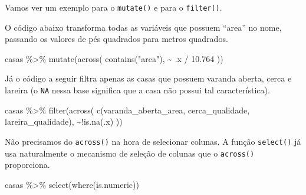 \documentclass[
]{book}
\newenvironment{Shaded}{\begin{snugshade}}{\end{snugshade}}
\newcommand{\FloatTok}[1]{\textcolor[rgb]{0.00,0.00,0.81}{#1}}
\newcommand{\FunctionTok}[1]{\textcolor[rgb]{0.00,0.00,0.00}{#1}}
\newcommand{\NormalTok}[1]{#1}
\newcommand{\SpecialCharTok}[1]{\textcolor[rgb]{0.00,0.00,0.00}{#1}}
\newcommand{\StringTok}[1]{\textcolor[rgb]{0.31,0.60,0.02}{#1}}
\begin{document}
Vamos ver um exemplo para o \texttt{mutate()} e para o \texttt{filter()}.

O código abaixo transforma todas as variáveis que possuem ``area'' no nome, passando os valores de pés quadrados para metros quadrados.

\begin{Shaded}
\begin{Highlighting}[]
\NormalTok{casas }\SpecialCharTok{\%\textgreater{}\%}
  \FunctionTok{mutate}\NormalTok{(}\FunctionTok{across}\NormalTok{(}
    \FunctionTok{contains}\NormalTok{(}\StringTok{"area"}\NormalTok{),}
    \SpecialCharTok{\textasciitilde{}}\NormalTok{ .x }\SpecialCharTok{/} \FloatTok{10.764}
\NormalTok{  ))}
\end{Highlighting}
\end{Shaded}

Já o código a seguir filtra apenas as casas que possuem varanda aberta, cerca e lareira (o \texttt{NA} nessa base significa que a casa não possui tal característica).

\begin{Shaded}
\begin{Highlighting}[]
\NormalTok{casas }\SpecialCharTok{\%\textgreater{}\%}
  \FunctionTok{filter}\NormalTok{(}\FunctionTok{across}\NormalTok{(}
    \FunctionTok{c}\NormalTok{(varanda\_aberta\_area, cerca\_qualidade, lareira\_qualidade),}
    \SpecialCharTok{\textasciitilde{}!}\FunctionTok{is.na}\NormalTok{(.x)}
\NormalTok{  )) }
\end{Highlighting}
\end{Shaded}

Não precisamos do \texttt{across()} na hora de selecionar colunas. A função \texttt{select()} já usa naturalmente o mecanismo de seleção de colunas que o \texttt{across()} proporciona.

\begin{Shaded}
\begin{Highlighting}[]
\NormalTok{casas }\SpecialCharTok{\%\textgreater{}\%}
  \FunctionTok{select}\NormalTok{(}\FunctionTok{where}\NormalTok{(is.numeric))}
\end{Highlighting}
\end{Shaded}
\end{document}

